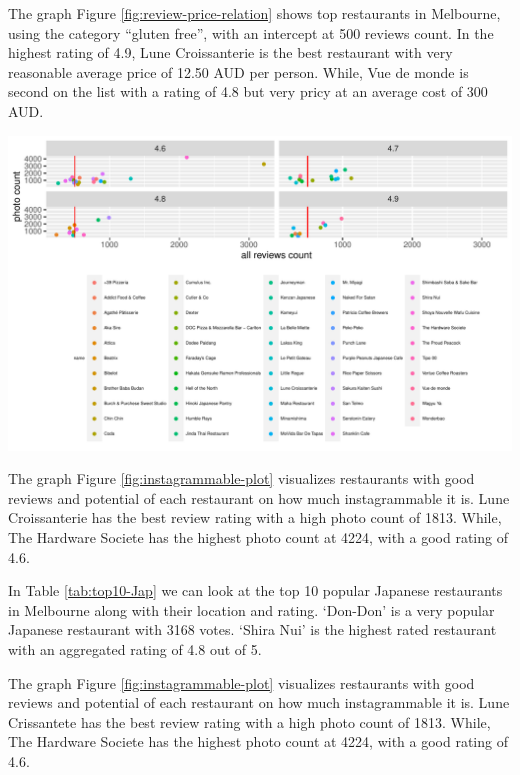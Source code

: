 \documentclass[11pt,a4paper,]{article}
\let\origfigure\figure
\let\endorigfigure\endfigure
\renewenvironment{figure}[1][2] {
    \expandafter\origfigure\expandafter[H]
} {
    \endorigfigure
}%
\begin{document}
The graph Figure \ref{fig:review-price-relation} shows top restaurants in Melbourne, using the category ``gluten free'', with an intercept at 500 reviews count. In the highest rating of 4.9, Lune Croissanterie is the best restaurant with very reasonable average price of 12.50 AUD per person. While, Vue de monde is second on the list with a rating of 4.8 but very pricy at an average cost of 300 AUD.

\begin{figure}[H]

{\centering \includegraphics{assignment4_files/figure-latex/instagrammable-plot-1} 

}

\caption{Can I instagram it?}\label{fig:instagrammable-plot}
\end{figure}

The graph Figure \ref{fig:instagrammable-plot} visualizes restaurants with good reviews and potential of each restaurant on how much instagrammable it is. Lune Croissanterie has the best review rating with a high photo count of 1813. While, The Hardware Societe has the highest photo count at 4224, with a good rating of 4.6.

In Table \ref{tab:top10-Jap} we can look at the top 10 popular Japanese restaurants in Melbourne along with their location and rating. `Don-Don' is a very popular Japanese restaurant with 3168 votes. `Shira Nui' is the highest rated restaurant with an aggregated rating of 4.8 out of 5.

The graph Figure \ref{fig:instagrammable-plot} visualizes restaurants with good reviews and potential of each restaurant on how much instagrammable it is. Lune Crissantete has the best review rating with a high photo count of 1813. While, The Hardware Societe has the highest photo count at 4224, with a good rating of 4.6.
\end{document}
